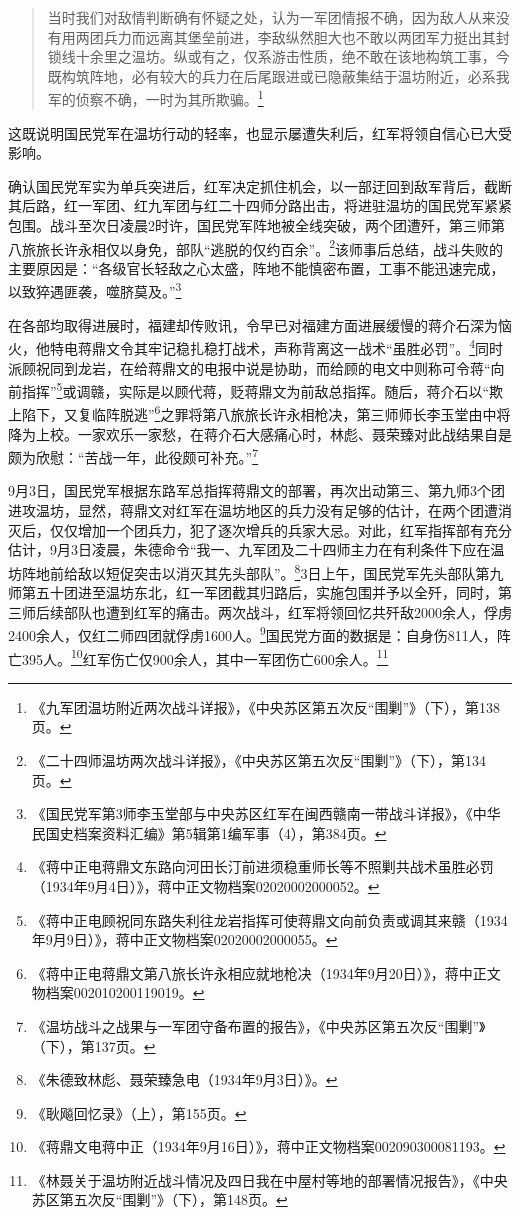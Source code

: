 \begin{quote}

当时我们对敌情判断确有怀疑之处，认为一军团情报不确，因为敌人从来没有用两团兵力而远离其堡垒前进，李敌纵然胆大也不敢以两团军力挺出其封锁线十余里之温坊。纵或有之，仅系游击性质，绝不敢在该地构筑工事，今既构筑阵地，必有较大的兵力在后尾跟进或已隐蔽集结于温坊附近，必系我军的侦察不确，一时为其所欺骗。\footnote{《九军团温坊附近两次战斗详报》，《中央苏区第五次反“围剿”》（下），第138页。}
\end{quote}


这既说明国民党军在温坊行动的轻率，也显示屡遭失利后，红军将领自信心已大受影响。


确认国民党军实为单兵突进后，红军决定抓住机会，以一部迂回到敌军背后，截断其后路，红一军团、红九军团与红二十四师分路出击，将进驻温坊的国民党军紧紧包围。战斗至次日凌晨2时许，国民党军阵地被全线突破，两个团遭歼，第三师第八旅旅长许永相仅以身免，部队“逃脱的仅约百余”。\footnote{《二十四师温坊两次战斗详报》，《中央苏区第五次反“围剿”》（下），第134页。}该师事后总结，战斗失败的主要原因是：“各级官长轻敌之心太盛，阵地不能慎密布置，工事不能迅速完成，以致猝遇匪袭，噬脐莫及。”\footnote{《国民党军第3师李玉堂部与中央苏区红军在闽西赣南一带战斗详报》，《中华民国史档案资料汇编》第5辑第1编军事（4），第384页。}


在各部均取得进展时，福建却传败讯，令早已对福建方面进展缓慢的蒋介石深为恼火，他特电蒋鼎文令其牢记稳扎稳打战术，声称背离这一战术“虽胜必罚”。\footnote{《蒋中正电蒋鼎文东路向河田长汀前进须稳重师长等不照剿共战术虽胜必罚（1934年9月4日）》，蒋中正文物档案02020002000052。}同时派顾祝同到龙岩，在给蒋鼎文的电报中说是协助，而给顾的电文中则称可令蒋“向前指挥”\footnote{《蒋中正电顾祝同东路失利往龙岩指挥可使蒋鼎文向前负责或调其来赣（1934年9月9日）》，蒋中正文物档案02020002000055。}或调赣，实际是以顾代蒋，贬蒋鼎文为前敌总指挥。随后，蒋介石以“欺上陷下，又复临阵脱逃”\footnote{《蒋中正电蒋鼎文第八旅长许永相应就地枪决（1934年9月20日）》，蒋中正文物档案002010200119019。}之罪将第八旅旅长许永相枪决，第三师师长李玉堂由中将降为上校。一家欢乐一家愁，在蒋介石大感痛心时，林彪、聂荣臻对此战结果自是颇为欣慰：“苦战一年，此役颇可补充。”\footnote{《温坊战斗之战果与一军团守备布置的报告》，《中央苏区第五次反“围剿”》（下），第137页。}


9月3日，国民党军根据东路军总指挥蒋鼎文的部署，再次出动第三、第九师3个团进攻温坊，显然，蒋鼎文对红军在温坊地区的兵力没有足够的估计，在两个团遭消灭后，仅仅增加一个团兵力，犯了逐次增兵的兵家大忌。对此，红军指挥部有充分估计，9月3日凌晨，朱德命令“我一、九军团及二十四师主力在有利条件下应在温坊阵地前给敌以短促突击以消灭其先头部队”。\footnote{《朱德致林彪、聂荣臻急电（1934年9月3日）》。}3日上午，国民党军先头部队第九师第五十团进至温坊东北，红一军团截其归路后，实施包围并予以全歼，同时，第三师后续部队也遭到红军的痛击。两次战斗，红军将领回忆共歼敌2000余人，俘虏2400余人，仅红二师四团就俘虏1600人。\footnote{《耿飚回忆录》（上），第155页。}国民党方面的数据是：自身伤811人，阵亡395人。\footnote{《蒋鼎文电蒋中正（1934年9月16日）》，蒋中正文物档案002090300081193。}红军伤亡仅900余人，其中一军团伤亡600余人。\footnote{《林聂关于温坊附近战斗情况及四日我在中屋村等地的部署情况报告》，《中央苏区第五次反“围剿”》（下），第148页。}


